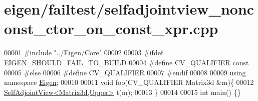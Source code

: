 \hypertarget{eigen_2failtest_2selfadjointview__nonconst__ctor__on__const__xpr_8cpp_source}{}\section{eigen/failtest/selfadjointview\+\_\+nonconst\+\_\+ctor\+\_\+on\+\_\+const\+\_\+xpr.cpp}
\label{eigen_2failtest_2selfadjointview__nonconst__ctor__on__const__xpr_8cpp_source}

\begin{DoxyCode}
00001 \textcolor{preprocessor}{#include "../Eigen/Core"}
00002 
00003 \textcolor{preprocessor}{#ifdef EIGEN\_SHOULD\_FAIL\_TO\_BUILD}
00004 \textcolor{preprocessor}{#define CV\_QUALIFIER const}
00005 \textcolor{preprocessor}{#else}
00006 \textcolor{preprocessor}{#define CV\_QUALIFIER}
00007 \textcolor{preprocessor}{#endif}
00008 
00009 \textcolor{keyword}{using namespace }\hyperlink{namespace_eigen}{Eigen};
00010 
00011 \textcolor{keywordtype}{void} foo(CV\_QUALIFIER Matrix3d &m)\{
00012     \hyperlink{group___core___module_class_eigen_1_1_self_adjoint_view}{SelfAdjointView<Matrix3d,Upper>} t(m);
00013 \}
00014 
00015 \textcolor{keywordtype}{int} main() \{\}
\end{DoxyCode}
